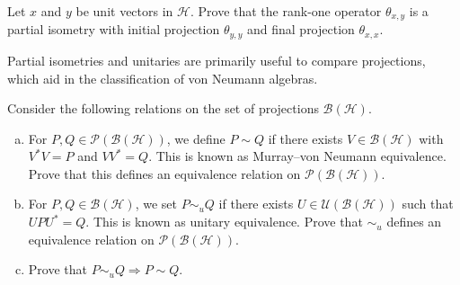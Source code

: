 \documentclass[10pt]{mypackage}
\begin{document}
\begin{exercise}
  Let $x$ and $y$ be unit vectors in $\mathcal{H}$. Prove that the rank-one operator $\theta_{x,y}$ is a partial isometry with initial projection $\theta_{y,y}$ and final projection $\theta_{x,x}$.
\end{exercise}
Partial isometries and unitaries are primarily useful to compare projections, which aid in the classification of von Neumann algebras.
\begin{exercise}
  Consider the following relations on the set of projections $\mathcal{B}\left(\mathcal{H}\right)$.
  \begin{enumerate}[(a)]
    \item For $P,Q\in \mathcal{P}\left(\mathcal{B}\left(\mathcal{H}\right)\right)$, we define $P\sim Q$ if there exists $V\in \mathcal{B}\left(\mathcal{H}\right)$ with $V^{\ast}V = P$ and $VV^{\ast} = Q$. This is known as Murray--von Neumann equivalence. Prove that this defines an equivalence relation on $\mathcal{P}\left(\mathcal{B}\left(\mathcal{H}\right)\right)$.
    \item For $P,Q\in \mathcal{B}\left(\mathcal{H}\right)$, we set $P\sim_{u} Q$ if there exists $U\in \mathcal{U}\left(\mathcal{B}\left(\mathcal{H}\right)\right)$ such that $UPU^{\ast} = Q$. This is known as unitary equivalence. Prove that $\sim_{u}$ defines an equivalence relation on $\mathcal{P}\left(\mathcal{B}\left(\mathcal{H}\right)\right)$.
    \item Prove that $P\sim_{u}Q \Rightarrow P\sim Q$.
  \end{enumerate}
\end{exercise}
\end{document}
